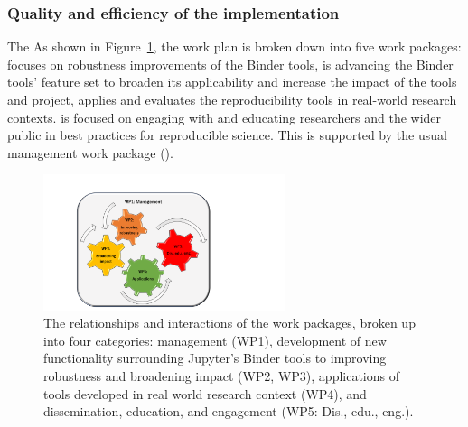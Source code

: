 

\subsubsection{Quality and efficiency of the implementation}\label{sec:workplan-structure}

\ifgrantagreement The \else As shown in
Figure~\ref{fig:workpackages}, the \fi work plan is broken down into five work
packages:  focuses on robustness improvements of the
Binder tools,  is advancing the Binder tools' feature set to
broaden its applicability and increase the impact of the tools and project,  applies and
evaluates the reproducibility tools in real-world research contexts.
 is focused on engaging with and educating researchers and the
wider public in best practices for reproducible science. This is supported by
the usual management work package ().

\begin{figure}[htb]
  \centering
  \includegraphics[width=0.63\textwidth]{images/WP.pdf}
  \caption{
    \label{fig:workpackages}
    The relationships and interactions of the work packages,
    broken up into four categories: management (WP1),
    development of new functionality surrounding Jupyter's Binder tools to improving robustness
    and broadening impact (WP2, WP3),
    applications of tools developed in real world research context (WP4),
    and dissemination, education, and engagement (WP5: Dis., edu., eng.).
  }
\end{figure}

